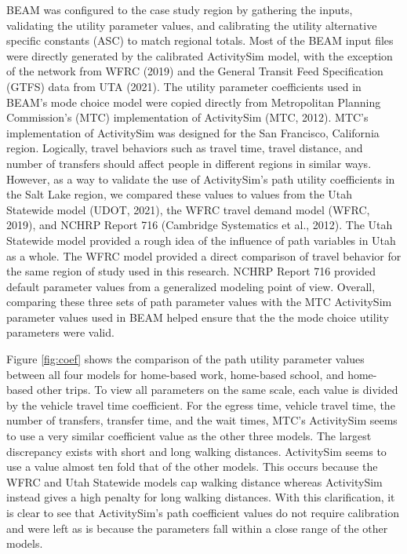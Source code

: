 \documentclass[fancy, masters]{byuthesis}
\begin{document}
BEAM was configured to the case study region by gathering the inputs, validating the utility parameter values, and calibrating the utility alternative specific constants (ASC) to match regional totals. Most of the BEAM input files were directly generated by the calibrated ActivitySim model, with the exception of the network from WFRC (2019) and the General Transit Feed Specification (GTFS) data from UTA (2021). The utility parameter coefficients used in BEAM's mode choice model were copied directly from Metropolitan Planning Commission's (MTC) implementation of ActivitySim (MTC, 2012). MTC's implementation of ActivitySim was designed for the San Francisco, California region. Logically, travel behaviors such as travel time, travel distance, and number of transfers should affect people in different regions in similar ways. However, as a way to validate the use of ActivitySim's path utility coefficients in the Salt Lake region, we compared these values to values from the Utah Statewide model (UDOT, 2021), the WFRC travel demand model (WFRC, 2019), and NCHRP Report 716 (Cambridge Systematics et al., 2012). The Utah Statewide model provided a rough idea of the influence of path variables in Utah as a whole. The WFRC model provided a direct comparison of travel behavior for the same region of study used in this research. NCHRP Report 716 provided default parameter values from a generalized modeling point of view. Overall, comparing these three sets of path parameter values with the MTC ActivitySim parameter values used in BEAM helped ensure that the the mode choice utility parameters were valid.

Figure \ref{fig:coef} shows the comparison of the path utility parameter values between all four models for home-based work, home-based school, and home-based other trips. To view all parameters on the same scale, each value is divided by the vehicle travel time coefficient. For the egress time, vehicle travel time, the number of transfers, transfer time, and the wait times, MTC's ActivitySim seems to use a very similar coefficient value as the other three models. The largest discrepancy exists with short and long walking distances. ActivitySim seems to use a value almost ten fold that of the other models. This occurs because the WFRC and Utah Statewide models cap walking distance whereas ActivitySim instead gives a high penalty for long walking distances. With this clarification, it is clear to see that ActivitySim's path coefficient values do not require calibration and were left as is because the parameters fall within a close range of the other models.
\end{document}
